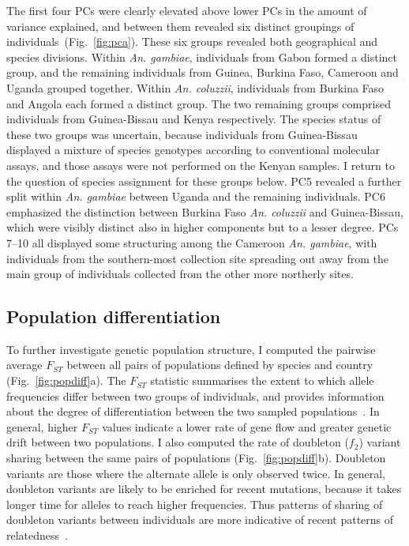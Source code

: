 \begin{refsection}
The first four PCs were clearly elevated above lower PCs in the amount of variance explained, and between them revealed six distinct groupings of individuals~(Fig.~\ref{fig:pca}).
%
These six groups revealed both geographical and species divisions.
%
Within \textit{An. gambiae}, individuals from Gabon formed a distinct group, and the remaining individuals from Guinea, Burkina Faso, Cameroon and Uganda grouped together.
%
Within \textit{An. coluzzii}, individuals from Burkina Faso and Angola each formed a distinct group.
%
The two remaining groups comprised individuals from Guinea-Bissau and Kenya respectively.
%
The species status of these two groups was uncertain, because individuals from Guinea-Bissau displayed a mixture of species genotypes according to conventional molecular assays, and those assays were not performed on the Kenyan samples.
%
I return to the question of species assignment for these groups below.
%
PC5 revealed a further split within \textit{An. gambiae} between Uganda and the remaining individuals.
%
PC6 emphasized the distinction between Burkina Faso \textit{An. coluzzii} and Guinea-Bissau, which were visibly distinct also in higher components but to a lesser degree.
%
PCs 7--10 all displayed some structuring among the Cameroon \textit{An. gambiae}, with individuals from the southern-most collection site spreading out away from the main group of individuals collected from the other more northerly sites.


\subsection{Population differentiation}\label{subsec:pop-diff}


To further investigate genetic population structure, I computed the pairwise average $F_{ST}$ between all pairs of populations defined by species and country (Fig.~\ref{fig:popdiff}a).
%
The $F_{ST}$ statistic summarises the extent to which allele frequencies differ between two groups of individuals, and provides information about the degree of differentiation between the two sampled populations~\parencite{Rousset1997,Holsinger2009,Bhatia2013}.
%
In general, higher $F_{ST}$ values indicate a lower rate of gene flow and greater genetic drift between two populations.
%
I also computed the rate of doubleton ($f_{2}$) variant sharing between the same pairs of populations (Fig.~\ref{fig:popdiff}b).
%
Doubleton variants are those where the alternate allele is only observed twice.
%
In general, doubleton variants are likely to be enriched for recent mutations, because it takes longer time for alleles to reach higher frequencies.
%
Thus patterns of sharing of doubleton variants between individuals are more indicative of recent patterns of relatedness~\parencite{1000G2012}.



\end{refsection}
